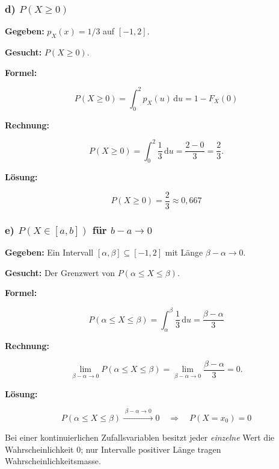 \subsubsection*{d) $P(X \geq 0)$}

\begin{beispiel}

\textbf{Gegeben:} $p_X(x) = 1/3$ auf $[-1, 2]$.

\textbf{Gesucht:} $P(X \geq 0)$.

\textbf{Formel:}

$$
P(X \geq 0) = \int_0^{2} p_X(u)\,\mathrm{d}u = 1 - F_X(0)
$$

\textbf{Rechnung:}

$$
P(X \geq 0) = \int_0^{2} \frac{1}{3}\,\mathrm{d}u = \frac{2 - 0}{3} = \frac{2}{3}.
$$

\textbf{Lösung:}

$$
\boxed{\;P(X \geq 0) = \frac{2}{3} \approx 0{,}667\;}
$$

\end{beispiel}

\subsubsection*{e) $P(X \in [a, b])$ für $b - a \to 0$}

\begin{beispiel}

\textbf{Gegeben:} Ein Intervall $[\alpha, \beta] \subseteq [-1, 2]$ mit
Länge $\beta - \alpha \to 0$.

\textbf{Gesucht:} Der Grenzwert von $P(\alpha \leq X \leq \beta)$.

\textbf{Formel:}

$$
P(\alpha \leq X \leq \beta) = \int_{\alpha}^{\beta} \frac{1}{3}\,\mathrm{d}u
= \frac{\beta - \alpha}{3}
$$

\textbf{Rechnung:}

$$
\lim_{\beta - \alpha \to 0} P(\alpha \leq X \leq \beta)
= \lim_{\beta - \alpha \to 0} \frac{\beta - \alpha}{3} = 0.
$$

\textbf{Lösung:}

$$
\boxed{\;P(\alpha \leq X \leq \beta) \xrightarrow{\;\beta - \alpha \to 0\;} 0
\quad\Longrightarrow\quad P(X = x_0) = 0\;}
$$

Bei einer kontinuierlichen Zufallsvariablen besitzt jeder \emph{einzelne} Wert
die Wahrscheinlichkeit $0$; nur Intervalle positiver Länge tragen
Wahrscheinlichkeitsmasse.

\end{beispiel}

